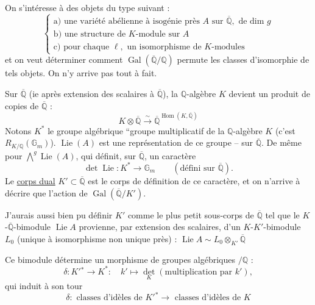 On s'intéresse à des objets du type suivant :
\[
\left\{\begin{array}{l}
\text{a) une variété abélienne à isogénie près } A\text{ sur }\overline{\mathbb{Q}},\text{ de dim }g\\[4pt]
\text{b) une structure de }K\text{-module sur }A\\[4pt]
\text{c) pour chaque }\ell,\text{ un isomorphisme de }K\text{-modules}
\end{array}\right.
\]
et on veut déterminer comment $\operatorname{Gal}(\overline{\mathbb{Q}}/\mathbb{Q})$ permute les classes d'isomorphie de tels objets. On n'y arrive pas tout à fait.

Sur $\overline{\mathbb{Q}}$ (ie après extension des scalaires à $\overline{\mathbb{Q}}$), la $\mathbb{Q}$-algèbre $K$ devient un produit de copies de $\overline{\mathbb{Q}}$ :
\[
K\otimes\overline{\mathbb{Q}}\xrightarrow{\sim}\overline{\mathbb{Q}}^{\operatorname{Hom}(K,\overline{\mathbb{Q}})}
\]
Notons $K^*$ le groupe algébrique ``groupe multiplicatif de la $\mathbb{Q}$-algèbre $K$ (c'est $R_{K/\mathbb{Q}}(\mathbb{G}_m)$). $\operatorname{Lie}(A)$ est une représentation de ce groupe -- sur $\overline{\mathbb{Q}}$.
De même pour $\bigwedge^g\operatorname{Lie}(A)$, qui définit, sur $\overline{\mathbb{Q}}$, un caractère
\[
\det\operatorname{Lie}:K^*\longrightarrow\mathbb{G}_m\qquad(\text{défini sur }\overline{\mathbb{Q}}).
\]
Le \uline{corps dual} $K'\subset\overline{\mathbb{Q}}$ est le corps de définition de ce caractère, et on n'arrive à décrire que l'action de $\operatorname{Gal}(\overline{\mathbb{Q}}/K')$.

J'aurais aussi bien pu définir $K'$ comme le plus petit sous-corps de $\overline{\mathbb{Q}}$ tel que le $K$-$\overline{\mathbb{Q}}$-bimodule $\operatorname{Lie} A$ provienne, par extension des scalaires, d'un $K$-$K'$-bimodule $L_0$ (unique à isomorphisme non unique près) : $\operatorname{Lie} A\sim L_0\otimes_{K'}\overline{\mathbb{Q}}$

Ce bimodule détermine un morphisme de groupes algébriques $/\mathbb{Q}$ :
\[
\delta:K'{}^*\longrightarrow K^*:\quad k'\longmapsto\det_K(\text{multiplication par }k'),
\]
qui induit à son tour
\[
\delta:\text{ classes d'idèles de }K'{}^*\longrightarrow\text{ classes d'idèles de }K
\]


